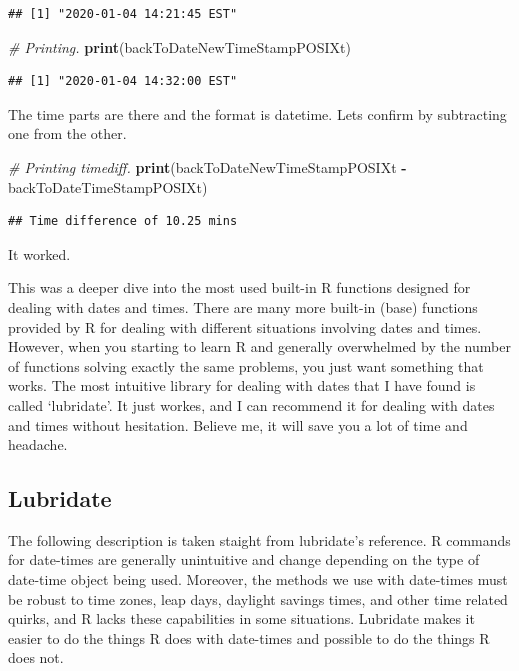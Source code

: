 \documentclass[]{book}
\newenvironment{Shaded}{\begin{snugshade}}{\end{snugshade}}
\newcommand{\CommentTok}[1]{\textcolor[rgb]{0.56,0.35,0.01}{\textit{#1}}}
\newcommand{\KeywordTok}[1]{\textcolor[rgb]{0.13,0.29,0.53}{\textbf{#1}}}
\newcommand{\NormalTok}[1]{#1}
\newcommand{\OperatorTok}[1]{\textcolor[rgb]{0.81,0.36,0.00}{\textbf{#1}}}
\newcommand{\StringTok}[1]{\textcolor[rgb]{0.31,0.60,0.02}{#1}}
\begin{document}
\begin{verbatim}
## [1] "2020-01-04 14:21:45 EST"
\end{verbatim}

\begin{Shaded}
\begin{Highlighting}[]
\CommentTok{# Printing.}
\KeywordTok{print}\NormalTok{(backToDateNewTimeStampPOSIXt)}
\end{Highlighting}
\end{Shaded}

\begin{verbatim}
## [1] "2020-01-04 14:32:00 EST"
\end{verbatim}

The time parts are there and the format is datetime. Lets confirm by subtracting one from the other.

\begin{Shaded}
\begin{Highlighting}[]
\CommentTok{# Printing timediff.}
\KeywordTok{print}\NormalTok{(backToDateNewTimeStampPOSIXt }\OperatorTok{-}\StringTok{ }\NormalTok{backToDateTimeStampPOSIXt)}
\end{Highlighting}
\end{Shaded}

\begin{verbatim}
## Time difference of 10.25 mins
\end{verbatim}

It worked.

This was a deeper dive into the most used built-in R functions designed for dealing with dates and times. There are many more built-in (base) functions provided by R for dealing with different situations involving dates and times. However, when you starting to learn R and generally overwhelmed by the number of functions solving exactly the same problems, you just want something that works. The most intuitive library for dealing with dates that I have found is called `lubridate'. It just workes, and I can recommend it for dealing with dates and times without hesitation. Believe me, it will save you a lot of time and headache.

\hypertarget{lubridate}{%
\subsection{Lubridate}\label{lubridate}}

The following description is taken staight from lubridate's reference. R commands for date-times are generally unintuitive and change depending on the type of date-time object being used. Moreover, the methods we use with date-times must be robust to time zones, leap days, daylight savings times, and other time related quirks, and R lacks these capabilities in some situations. Lubridate makes it easier to do the things R does with date-times and possible to do the things R does not.
\end{document}
